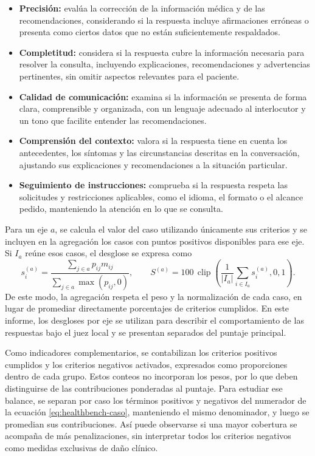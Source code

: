 \begingroup
\begin{itemize}
\item \textbf{Precisión:} evalúa la corrección de la información médica y de las recomendaciones, considerando si la respuesta incluye afirmaciones erróneas o presenta como ciertos datos que no están suficientemente respaldados.
\item \textbf{Completitud:} considera si la respuesta cubre la información necesaria para resolver la consulta, incluyendo explicaciones, recomendaciones y advertencias pertinentes, sin omitir aspectos relevantes para el paciente.
\item \textbf{Calidad de comunicación:} examina si la información se presenta de forma clara, comprensible y organizada, con un lenguaje adecuado al interlocutor y un tono que facilite entender las recomendaciones.
\item \textbf{Comprensión del contexto:} valora si la respuesta tiene en cuenta los antecedentes, los síntomas y las circunstancias descritas en la conversación, ajustando sus explicaciones y recomendaciones a la situación particular.
\item \textbf{Seguimiento de instrucciones:} comprueba si la respuesta respeta las solicitudes y restricciones aplicables, como el idioma, el formato o el alcance pedido, manteniendo la atención en lo que se consulta.
\end{itemize}
\endgroup

Para un eje $a$, se calcula el valor del caso utilizando únicamente sus criterios y se incluyen en la agregación los casos con puntos positivos disponibles para ese eje. Si $I_a$ reúne esos casos, el desglose se expresa como
\begin{equation}
s_i^{(a)}=\frac{\sum_{j\in a}p_{ij}m_{ij}}{\sum_{j\in a}\max(p_{ij},0)},
\qquad S^{(a)}=100\,\operatorname{clip}\!\left(
\frac{1}{|I_a|}\sum_{i\in I_a}s_i^{(a)},0,1\right).
\label{eq:healthbench-ejes}
\end{equation}
De este modo, la agregación respeta el peso y la normalización de cada caso, en lugar de promediar directamente porcentajes de criterios cumplidos. En este informe, los desgloses por eje se utilizan para describir el comportamiento de las respuestas bajo el juez local y se presentan separados del puntaje principal.

Como indicadores complementarios, se contabilizan los criterios positivos cumplidos y los criterios negativos activados, expresados como proporciones dentro de cada grupo. Estos conteos no incorporan los pesos, por lo que deben distinguirse de las contribuciones ponderadas al puntaje. Para estudiar ese balance, se separan por caso los términos positivos y negativos del numerador de la ecuación \ref{eq:healthbench-caso}, manteniendo el mismo denominador, y luego se promedian sus contribuciones. Así puede observarse si una mayor cobertura se acompaña de más penalizaciones, sin interpretar todos los criterios negativos como medidas exclusivas de daño clínico.

